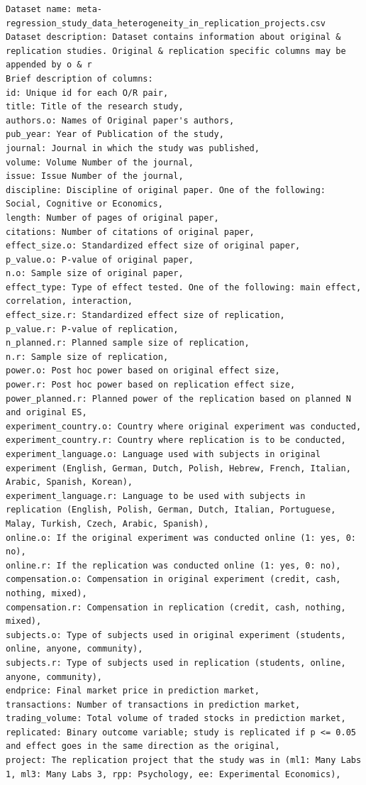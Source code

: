 \begin{verbatim}
Dataset name: meta-regression_study_data_heterogeneity_in_replication_projects.csv
Dataset description: Dataset contains information about original & replication studies. Original & replication specific columns may be appended by o & r
Brief description of columns:
id: Unique id for each O/R pair,
title: Title of the research study,
authors.o: Names of Original paper's authors,
pub_year: Year of Publication of the study,
journal: Journal in which the study was published,
volume: Volume Number of the journal,
issue: Issue Number of the journal,
discipline: Discipline of original paper. One of the following: Social, Cognitive or Economics,
length: Number of pages of original paper,
citations: Number of citations of original paper,
effect_size.o: Standardized effect size of original paper,
p_value.o: P-value of original paper,
n.o: Sample size of original paper,
effect_type: Type of effect tested. One of the following: main effect, correlation, interaction,
effect_size.r: Standardized effect size of replication,
p_value.r: P-value of replication,
n_planned.r: Planned sample size of replication,
n.r: Sample size of replication,
power.o: Post hoc power based on original effect size,
power.r: Post hoc power based on replication effect size,
power_planned.r: Planned power of the replication based on planned N and original ES,
experiment_country.o: Country where original experiment was conducted,
experiment_country.r: Country where replication is to be conducted,
experiment_language.o: Language used with subjects in original experiment (English, German, Dutch, Polish, Hebrew, French, Italian, Arabic, Spanish, Korean),  
experiment_language.r: Language to be used with subjects in replication (English, Polish, German, Dutch, Italian, Portuguese, Malay, Turkish, Czech, Arabic, Spanish),
online.o: If the original experiment was conducted online (1: yes, 0: no),
online.r: If the replication was conducted online (1: yes, 0: no),
compensation.o: Compensation in original experiment (credit, cash, nothing, mixed),
compensation.r: Compensation in replication (credit, cash, nothing, mixed),
subjects.o: Type of subjects used in original experiment (students, online, anyone, community),
subjects.r: Type of subjects used in replication (students, online, anyone, community),
endprice: Final market price in prediction market,
transactions: Number of transactions in prediction market,
trading_volume: Total volume of traded stocks in prediction market,
replicated: Binary outcome variable; study is replicated if p <= 0.05 and effect goes in the same direction as the original,
project: The replication project that the study was in (ml1: Many Labs 1, ml3: Many Labs 3, rpp: Psychology, ee: Experimental Economics),

\end{verbatim}
